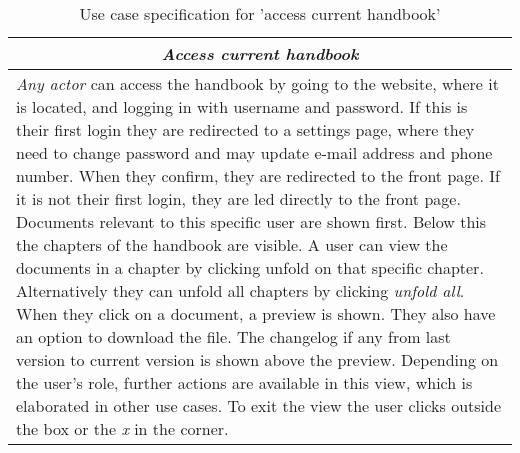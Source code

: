 \begin{table}[H]
\centering
\begin{tabular}{p{14.5cm}}
\hline
\multicolumn{1}{c}{\textit{\textbf{Access current handbook}}} \\
\hline
\textit{Any actor} can access the handbook by going to the website, where it is located, and logging in with username and password.
If this is their first login they are redirected to a settings page, where they need to change password and may update e-mail address and phone number.
When they confirm, they are redirected to the front page.
If it is not their first login, they are led directly to the front page.
Documents relevant to this specific user are shown first.
Below this the chapters of the handbook are visible.
A user can view the documents in a chapter by clicking unfold on that specific chapter.
Alternatively they can unfold all chapters by clicking \textit{unfold all}.
When they click on a document, a preview is shown.
They also have an option to download the file.
The changelog if any from last version to current version is shown above the preview.
Depending on the user's role, further actions are available in this view, which is elaborated in other use cases.
To exit the view the user clicks outside the box or the \textit{x} in the corner.
\\\hline
\end{tabular}
\caption{Use case specification for 'access current handbook'}\label{tab:access-handbook}
\end{table}
